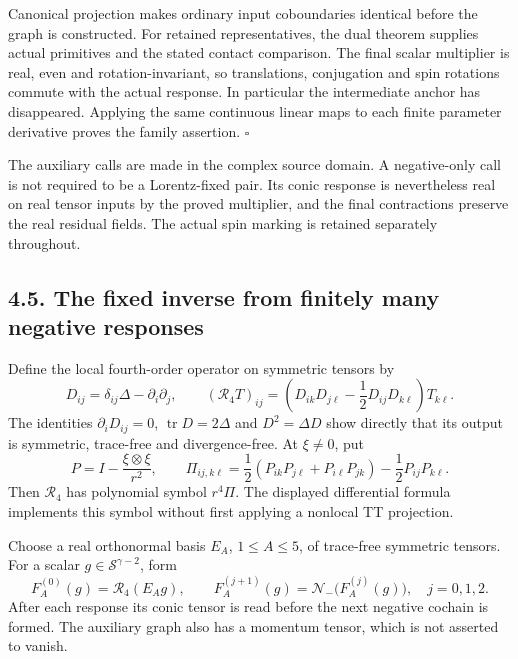 \documentclass[
  english,
  11pt,
  reqno]{amsart}
\begin{document}
Canonical projection makes ordinary input coboundaries identical before
the graph is constructed. For retained representatives, the dual theorem
supplies actual primitives and the stated contact comparison. The final
scalar multiplier is real, even and rotation-invariant, so translations,
conjugation and spin rotations commute with the actual response. In
particular the intermediate anchor has disappeared. Applying the same
continuous linear maps to each finite parameter derivative proves the
family assertion. \hfill\(\square\)

The auxiliary calls are made in the complex source domain. A
negative-only call is not required to be a Lorentz-fixed pair. Its conic
response is nevertheless real on real tensor inputs by the proved
multiplier, and the final contractions preserve the real residual
fields. The actual spin marking is retained separately throughout.

\subsection{4.5. The fixed inverse from finitely many negative
responses}\label{the-fixed-inverse-from-finitely-many-negative-responses}\label{sec:online-negative-response-green-word}

Define the local fourth-order operator on symmetric tensors by%
 \[
D_{ij}=\delta_{ij}\Delta-\partial_i\partial_j,\qquad
(\mathcal R_4T)_{ij}
=\left(D_{ik}D_{j\ell}-\frac12D_{ij}D_{k\ell}\right)T_{k\ell}.
\] The identities \(\partial_iD_{ij}=0\), \(\operatorname{tr}D=2\Delta\)
and \(D^2=\Delta D\) show directly that its output is symmetric,
trace-free and divergence-free. At \(\xi\ne0\), put%
 \[
P=I-\frac{\xi\otimes\xi}{r^2},\qquad
\Pi_{ij,k\ell}
=\frac12(P_{ik}P_{j\ell}+P_{i\ell}P_{jk})
 -\frac12P_{ij}P_{k\ell}.
\] Then \(\mathcal R_4\) has polynomial symbol \(r^4\Pi\). The displayed
differential formula implements this symbol without first applying a
nonlocal TT projection.

Choose a real orthonormal basis \(E_A\), \(1\le A\le5\), of trace-free
symmetric tensors. For a scalar \(g\in\mathscr S^{\gamma-2}\), form%
 \[
F_A^{(0)}(g)=\mathcal R_4(E_Ag),\qquad
F_A^{(j+1)}(g)=\mathcal N_-\bigl(F_A^{(j)}(g)\bigr),
\quad j=0,1,2.
\] After each response its conic tensor is read before the next negative
cochain is formed. The auxiliary graph also has a momentum tensor, which
is not asserted to vanish.
\end{document}
